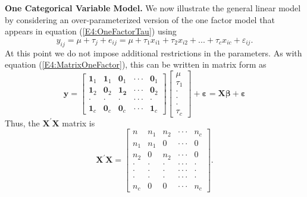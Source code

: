 \textbf{One Categorical Variable Model.} We now illustrate the
general linear model by considering an over-parameterized version of
the one factor model that appears in equation
(\ref{E4:OneFactorTau}) using
\begin{equation*}
y_{ij}=\mu +\tau_{j}+e_{ij}=\mu +\tau_1x_{i1}+\tau
_2x_{i2}+...+\tau_cx_{ic}+\varepsilon_{ij}.
\end{equation*}
At this point we do not impose additional restrictions in the
parameters. As with equation (\ref{E4:MatrixOneFactor}), this can be
written in matrix form as
\begin{equation*}
\mathbf{y}=
\begin{bmatrix}
\mathbf{1}_1 & \mathbf{1}_1 & \mathbf{0}_1 & \cdot
\cdot \cdot  & \mathbf{0}_1 \\
\mathbf{1}_2 & \mathbf{0}_2 & \mathbf{1}_{\mathbf{2}} & \cdot
\cdot \cdot  & \mathbf{0}_2 \\
\cdot  & \cdot  & \cdot  & \cdot \cdot \cdot  & \cdot  \\
\mathbf{1}_c & \mathbf{0}_c & \mathbf{0}_c & \cdot \cdot \cdot  &
\mathbf{1}_c
\end{bmatrix}
\begin{bmatrix}
\mu  \\
\tau_1 \\
\cdot  \\
\cdot  \\
\cdot  \\
\tau_c
\end{bmatrix}
+\boldsymbol \varepsilon = \mathbf{X \boldsymbol \beta +\boldsymbol
\varepsilon}
\end{equation*}
Thus, the $\mathbf{X}^{\prime }\mathbf{X}$ matrix is
\begin{equation*}
\mathbf{X}^{\prime }\mathbf{X}=%
\begin{bmatrix}
n & n_1 & n_2 & \cdot \cdot \cdot  & n_c \\
n_1 & n_1 & 0 & \cdot \cdot \cdot  & 0 \\
n_2 & 0 & n_2 & \cdot \cdot \cdot  & 0 \\
\cdot  & \cdot  & \cdot  & \cdot \cdot \cdot  & \cdot  \\
\cdot  & \cdot  & \cdot  & \cdot \cdot \cdot  & \cdot  \\
\cdot  & \cdot  & \cdot  & \cdot \cdot \cdot  & \cdot  \\
n_c & 0 & 0 & \cdot \cdot \cdot  & n_c%
\end{bmatrix}.
\end{equation*}

